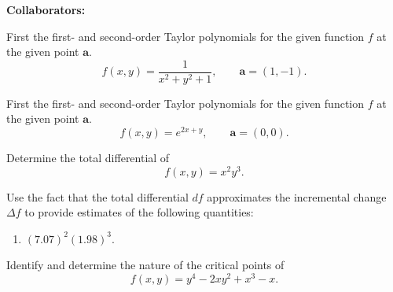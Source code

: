 \documentclass[11pt,letterpaper,boxed]{hmcpset}
\begin{document}
\noindent\textbf{Collaborators:} 


\begin{problem}[Colley 4.1 \#9]
First the first- and second-order Taylor polynomials for the given function $f$ at the given point $\mathbf{a}$.
\[
	f(x,y) = \frac{1}{x^2+y^2+1}, \qquad \mathbf{a} = (1,-1).
\]
\end{problem}

\begin{solution}
\vfill
\end{solution}
\newpage

\begin{problem}[Colley 4.1 \#10]
First the first- and second-order Taylor polynomials for the given function $f$ at the given point $\mathbf{a}$.
\[
	f(x,y) =e^{2x+y}, \qquad \mathbf{a} = (0,0).
\]
\end{problem}

\begin{solution}
\vfill
\end{solution}
\newpage

\begin{problem}[Colley 4.1 \#28]
Determine the total differential of
\[
	f(x,y)=x^2y^3.
\]
\end{problem}

\begin{solution}
\vfill
\end{solution}
\newpage

\begin{problem}[Colley 4.1 \#33(a)]
Use the fact that the total differential $d f$ approximates the incremental change
$\Delta f$ to provide estimates of the following quantities:
\begin{enumerate}
\item $(7.07)^2(1.98)^3.$
\end{enumerate}
\end{problem}

\begin{solution}
\vfill
\end{solution}
\newpage

\begin{problem}[Colley 4.2 \#6]
Identify and determine the nature of the critical points of
\[
	f(x,y) = y^4-2xy^2+x^3-x.
\]
\end{problem}

\begin{solution}
\vfill
\end{solution}
\newpage
\end{document}
